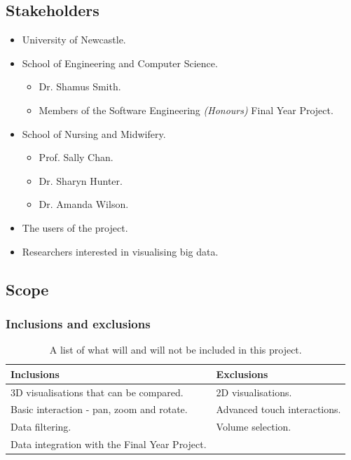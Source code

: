 \documentclass[a4paper]{article}
\begin{document}
{		\subsection{Stakeholders} {
		\label{sec:stakeholders}

			\begin{itemize}
				\item University of Newcastle.
				\item School of Engineering and Computer Science.
				\begin{itemize}
					\item Dr. Shamus Smith.
					\item Members of the Software Engineering \emph{(Honours)} Final Year Project.
				\end{itemize}
				\item School of Nursing and Midwifery.
				\begin{itemize}
					\item Prof. Sally Chan.
					\item Dr. Sharyn Hunter.
					\item Dr. Amanda Wilson.
				\end{itemize}
				\item The users of the project.
				\item Researchers interested in visualising big data.
			\end{itemize}		
		
		}
		
		\subsection{Scope} {
		\label{sec:scope}
		
			\subsubsection{Inclusions and exclusions} {
			\label{sec:inclusions_and_exclusions}
			
				\begin{table}[H]
				\caption{A list of what will and will not be included in this project.}
				\begin{tabularx}{\textwidth}{@{}XX@{}}
					\toprule
					\textbf{Inclusions} & \textbf{Exclusions} \\
					\midrule
					3D visualisations that can be compared. & 2D visualisations. \\
					Basic interaction - pan, zoom and rotate. & Advanced touch interactions. \\
					Data filtering. & Volume selection. \\
					Data integration with the Final Year Project. & \\
					\bottomrule
				\end{tabularx}
				\end{table}
			
}}}
\end{document}
